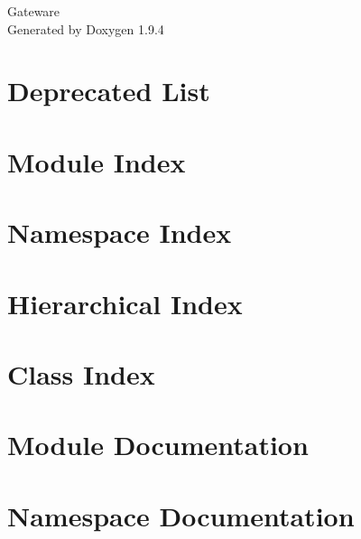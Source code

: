 \documentclass[twoside]{book}
\newcommand{\+}{\discretionary{\mbox{\scriptsize$\hookleftarrow$}}{}{}}
\newcommand{\clearemptydoublepage}{%
    \newpage{\pagestyle{empty}\cleardoublepage}%
  }
\begin{document}
  \raggedbottom
    \hypersetup{pageanchor=false,
                bookmarksnumbered=true,
                pdfencoding=unicode
               }
  \begin{titlepage}
  \vspace*{7cm}
  \begin{center}%
  {\Large Gateware}\\
  \vspace*{1cm}
  {\large Generated by Doxygen 1.9.4}\\
  \end{center}
  \end{titlepage}
  \clearemptydoublepage
  \tableofcontents
  \clearemptydoublepage
  \hypersetup{pageanchor=true}
\chapter{Deprecated List}
\label{deprecated}

\chapter{Module Index}

\chapter{Namespace Index}

\chapter{Hierarchical Index}

\chapter{Class Index}

\chapter{Module Documentation}








\chapter{Namespace Documentation}








\end{document}
